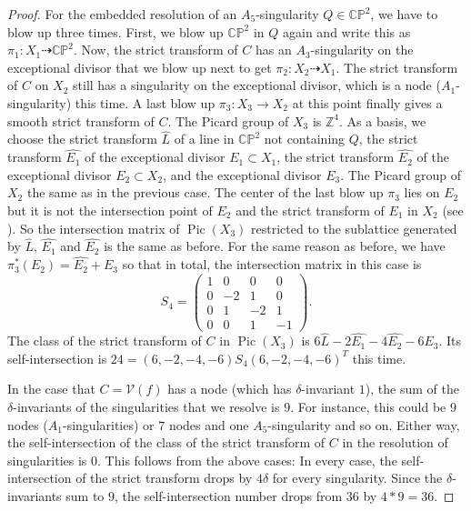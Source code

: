 \documentclass[a4paper]{article}
\numberwithin{equation}{section}
\newcommand{\Z}{\mathbb{Z}}
\newcommand{\C}{\mathbb{C}}
\renewcommand{\P}{\mathbb{P}}
\newcommand{\V}{\mathcal{V}}
\DeclareMathOperator{\pic}{Pic}
\newcommand{\wh}{\widehat}
\newcommand{\ratto}{\dashrightarrow}
\theoremstyle{definition}
\theoremstyle{remark}
\begin{document}
\begin{proof}
For the embedded resolution of an $A_5$-singularity $Q\in \C\P^2$, we have to blow up three times. First, we blow up $\C\P^2$ in $Q$ again and write this as $\pi_1\colon X_1 \ratto \C\P^2$. Now, the strict transform of $C$ has an $A_3$-singularity on the exceptional divisor that we blow up next to get $\pi_2\colon X_2 \ratto X_1$. The strict transform of $C$ on $X_2$ still has a singularity on the exceptional divisor, which is a node ($A_1$-singularity) this time. A last blow up $\pi_3 \colon X_3 \to X_2$ at this point finally gives a smooth strict transform of $C$. The Picard group of $X_3$ is $\Z^4$. As a basis, we choose the strict transform $\wh{L}$ of a line in $\C\P^2$ not containing $Q$, the strict transform $\wh{E_1}$ of the exceptional divisor $E_1\subset X_1$, the strict transform $\wh{E_2}$ of the exceptional divisor $E_2\subset X_2$, and the exceptional divisor $E_3$. The Picard group of $X_2$ the same as in the previous case. The center of the last blow up $\pi_3$ lies on $E_2$ but it is not the intersection point of $E_2$ and the strict transform of $E_1$ in $X_2$ (see \cite[Cor. V.3.7 and Exm. V.3.9.5]{Hartshorne}). So the intersection matrix of $\pic(X_3)$ restricted to the sublattice generated by $\wh{L}$, $\wh{E_1}$ and $\wh{E_2}$ is the same as before. For the same reason as before, we have $\pi_3^*(E_2) = \wh{E_2} + E_3$ so that in total, the intersection matrix in this case is
\[
S_4 = \begin{pmatrix}
1 & 0 & 0 & 0 \\
0 & -2 & 1 & 0 \\
0 & 1 & -2 & 1 \\
0 & 0 & 1 & -1
\end{pmatrix}.
\]
The class of the strict transform of $C$ in $\pic(X_3)$ is $6\wh{L} - 2\wh{E_1} - 4\wh{E_2} - 6 E_3$. Its self-intersection is $24 = (6,-2,-4,-6) S_4 (6,-2,-4,-6)^T$ this time.

In the case that $C = \V(f)$ has a node (which has $\delta$-invariant $1$), the sum of the $\delta$-invariants of the singularities that we resolve is $9$. For instance, this could be $9$ nodes ($A_1$-singularities) or $7$ nodes and one $A_5$-singularity and so on. Either way, the self-intersection of the class of the strict transform of $C$ in the resolution of singularities is $0$. This follows from the above cases: In every case, the self-intersection of the strict transform drops by $4\delta$ for every singularity. Since the $\delta$-invariants sum to $9$, the self-intersection number drops from $36$ by $4*9 = 36$.


\end{proof}
\end{document}
